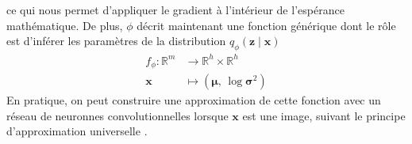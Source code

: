 ce qui nous permet d'appliquer le gradient à l'intérieur de l'espérance mathématique.
De plus, $\phi$ décrit maintenant une fonction générique dont le rôle est d'inférer les 
paramètres de la distribution $q_\phi(\mathbf{z} \mid \mathbf{x})$
\begin{equation}\label{eq:}
        \begin{aligned}
                f_\phi: \mathbb{R}^{m} &\rightarrow \mathbb{R}^{h} \times \mathbb{R}^{h}\\ \mathbf{x} &\mapsto (\boldsymbol{\mu},\, \log \boldsymbol{\sigma}^{2})
        \end{aligned}
\end{equation} 
En pratique, on peut construire une approximation de 
cette fonction avec un réseau de neuronnes convolutionnelles lorsque $\mathbf{x}$ est une image, 
suivant le principe d'approximation universelle \citep{Cybenko1989,Hornik1991}. 

